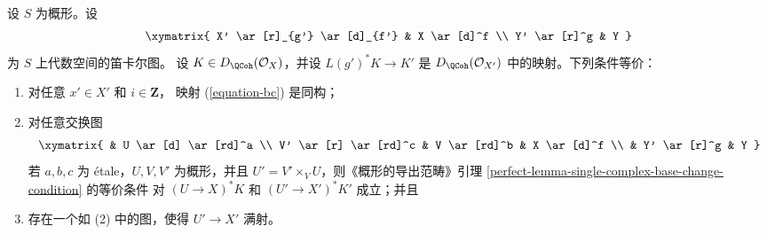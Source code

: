 \begin{lemma}
\label{lemma-single-complex-base-change-condition}
设 $S$ 为概形。设
$$
\xymatrix{
X' \ar[r]_{g'} \ar[d]_{f'} &
X \ar[d]^f \\
Y' \ar[r]^g &
Y
}
$$
为 $S$ 上代数空间的笛卡尔图。
设 $K \in D_\QCoh(\mathcal{O}_X)$，并设 $L(g')^*K \to K'$
是 $D_\QCoh(\mathcal{O}_{X'})$ 中的映射。下列条件等价：
\begin{enumerate}
\item 对任意 $x' \in X'$ 和 $i \in \mathbf{Z}$，%
映射 (\ref{equation-bc}) 是同构；
\item 对任意交换图
$$
\xymatrix{
& U \ar[d] \ar[rd]^a \\
V' \ar[r] \ar[rd]^c & V \ar[rd]^b & X \ar[d]^f \\
& Y' \ar[r]^g & Y
}
$$
若 $a, b, c$ 为 \'etale，$U, V, V'$ 为概形，并且
$U' = V' \times_V U$，则《概形的导出范畴》引理
\ref{perfect-lemma-single-complex-base-change-condition} 的等价条件
对 $(U \to X)^*K$ 和 $(U' \to X')^*K'$ 成立；并且
\item 存在一个如 (2) 中的图，使得 $U' \to X'$ 满射。
\end{enumerate}
\end{lemma}

